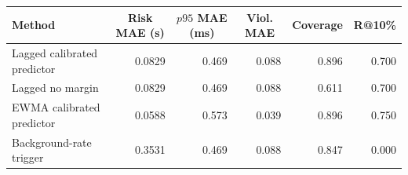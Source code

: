 \begin{tabular}{lrrrrr}
\hline
Method &
\multicolumn{1}{c}{Risk MAE (s)} &
\multicolumn{1}{c}{$p95$ MAE (ms)} &
\multicolumn{1}{c}{Viol. MAE} &
\multicolumn{1}{c}{Coverage} &
\multicolumn{1}{c}{R@10\%} \\
\hline
Lagged calibrated predictor & 0.0829 & 0.469 & 0.088 & 0.896 & 0.700 \\
Lagged no margin & 0.0829 & 0.469 & 0.088 & 0.611 & 0.700 \\
EWMA calibrated predictor & 0.0588 & 0.573 & 0.039 & 0.896 & 0.750 \\
Background-rate trigger & 0.3531 & 0.469 & 0.088 & 0.847 & 0.000 \\
\hline
\end{tabular}
